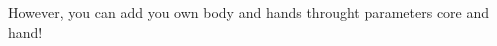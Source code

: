 \documentclass[preview]{standalone}
\begin{document}
\begin{center}
However, you can add you own body and hands throught parameters core and hand!
\end{center}
\end{document}
